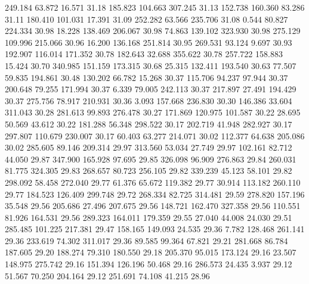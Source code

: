  249.184   63.872   16.571        31.18
 185.823  104.663  307.245        31.13
 152.738  160.360   83.286        31.11
 180.410  101.031   17.391        31.09
 252.282   63.566  235.706        31.08
   0.544   80.827  224.334        30.98
  18.228  138.469  206.067        30.98
  74.863  139.102  323.930        30.98
 275.129  109.996  215.066        30.96
  16.200  136.168  251.814        30.95
 269.531   93.124    9.697        30.93
 192.907  116.014  171.352        30.78
 182.643   32.688  355.622        30.78
 257.722  158.883   15.424        30.70
 340.985  151.159  173.315        30.68
  25.315  132.411  193.540        30.63
  77.507   59.835  194.861        30.48
 130.202   66.782   15.268        30.37
 115.706   94.237   97.944        30.37
 200.648   79.255  171.994        30.37
   6.339   79.005  242.113        30.37
 217.897   27.491  194.429        30.37
 275.756   78.917  210.931        30.36
   3.093  157.668  236.830        30.30
 146.386   33.604  311.043        30.28
 281.613   99.893  276.478        30.27
 171.869  120.975  101.587        30.22
  28.695   50.569   43.612        30.22
 181.288   56.348  298.522        30.17
 202.719   41.948  282.927        30.17
 297.807  110.679  230.007        30.17
  60.403   63.277  214.071        30.02
 112.377   64.638  205.086        30.02
 285.605   89.146  209.314        29.97
 313.560   53.034   27.749        29.97
 102.161   82.712   44.050        29.87
 347.900  165.928   97.695        29.85
 326.098   96.909  276.863        29.84
 260.031   81.775  324.305        29.83
 268.657   80.723  256.105        29.82
 339.239   45.123   58.101        29.82
 298.092   58.458  272.040        29.77
  61.376   65.672  119.382        29.77
  30.914  113.182  260.110        29.77
 184.523  126.409  299.748        29.72
 268.334   82.725  314.481        29.59
 278.820  157.196   35.548        29.56
 205.686   27.496  207.675        29.56
 148.721  162.470  327.358        29.56
 110.551   81.926  164.531        29.56
 289.323  164.011  179.359        29.55
  27.040   44.008   24.030        29.51
 285.485  101.225  217.381        29.47
 158.165  149.093   24.535        29.36
   7.782  128.468  261.141        29.36
 233.619   74.302  311.017        29.36
  89.585   99.364   67.821        29.21
 281.668   86.784  187.605        29.20
 188.274   79.310  180.550        29.18
 205.370   95.015  173.124        29.16
  23.507  148.975  275.742        29.16
 151.394  126.196   50.468        29.16
 286.573   24.435    3.937        29.12
  51.567   70.250  204.164        29.12
 251.691   74.108   41.215        28.96
